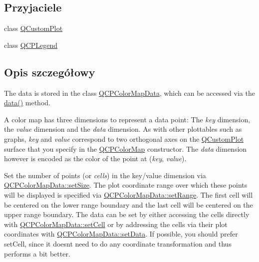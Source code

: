 \subsection*{Przyjaciele}
\begin{DoxyCompactItemize}
\item 
class \hyperlink{class_q_c_p_color_map_a1cdf9df76adcfae45261690aa0ca2198}{Q\+Custom\+Plot}
\item 
class \hyperlink{class_q_c_p_color_map_a8429035e7adfbd7f05805a6530ad5e3b}{Q\+C\+P\+Legend}
\end{DoxyCompactItemize}


\subsection{Opis szczegółowy}


The data is stored in the class \hyperlink{class_q_c_p_color_map_data}{Q\+C\+P\+Color\+Map\+Data}, which can be accessed via the \hyperlink{class_q_c_p_color_map_a3ae12c9ce842352037cd20ea5267414f}{data()} method.

A color map has three dimensions to represent a data point\+: The {\itshape key} dimension, the {\itshape value} dimension and the {\itshape data} dimension. As with other plottables such as graphs, {\itshape key} and {\itshape value} correspond to two orthogonal axes on the \hyperlink{class_q_custom_plot}{Q\+Custom\+Plot} surface that you specify in the \hyperlink{class_q_c_p_color_map}{Q\+C\+P\+Color\+Map} constructor. The {\itshape data} dimension however is encoded as the color of the point at ({\itshape key}, {\itshape value}).

Set the number of points (or {\itshape cells}) in the key/value dimension via \hyperlink{class_q_c_p_color_map_data_a0d9ff35c299d0478b682bfbcdd9c097e}{Q\+C\+P\+Color\+Map\+Data\+::set\+Size}. The plot coordinate range over which these points will be displayed is specified via \hyperlink{class_q_c_p_color_map_data_aad9c1c7c703c1339489fc730517c83d4}{Q\+C\+P\+Color\+Map\+Data\+::set\+Range}. The first cell will be centered on the lower range boundary and the last cell will be centered on the upper range boundary. The data can be set by either accessing the cells directly with \hyperlink{class_q_c_p_color_map_data_a8e75eaf8746596319032a93f3d2d0683}{Q\+C\+P\+Color\+Map\+Data\+::set\+Cell} or by addressing the cells via their plot coordinates with \hyperlink{class_q_c_p_color_map_data_afd2083ccfd6987ec94aa7ef8e91ca39a}{Q\+C\+P\+Color\+Map\+Data\+::set\+Data}. If possible, you should prefer set\+Cell, since it doesn\textquotesingle{}t need to do any coordinate transformation and thus performs a bit better.

